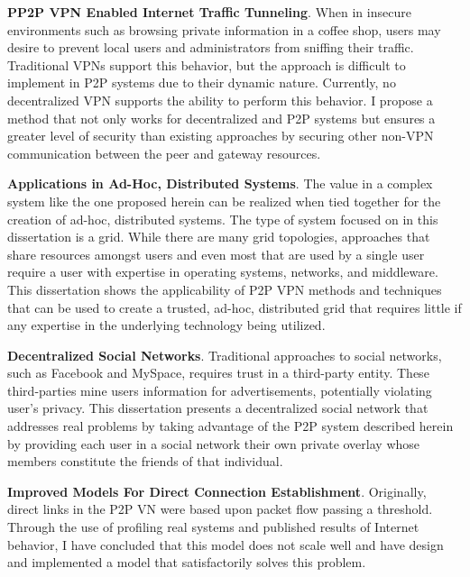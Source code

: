 {\bf PP2P VPN Enabled Internet Traffic Tunneling}. When in insecure
environments such as browsing private information in a coffee shop, users may
desire to prevent local users and administrators from sniffing their traffic.
Traditional VPNs support this behavior, but the approach is difficult to
implement in P2P systems due to their dynamic nature.  Currently, no
decentralized VPN supports the ability to perform this behavior.  I propose a
method that not only works for decentralized and P2P systems but ensures a
greater level of security than existing approaches by securing other non-VPN
communication between the peer and gateway resources.

{\bf Applications in Ad-Hoc, Distributed Systems}. The value in a complex
system like the one proposed herein can be realized when tied together for the
creation of ad-hoc, distributed systems.  The type of system focused on in this
dissertation is a grid.  While there are many grid topologies, approaches that
share resources amongst users and even most that are used by a single user
require a user with expertise in operating systems, networks, and middleware.
This dissertation shows the applicability of P2P VPN methods and techniques
that can be used to create a trusted, ad-hoc, distributed grid that requires
little if any expertise in the underlying technology being utilized.

{\bf Decentralized Social Networks}. Traditional approaches to social networks,
such as Facebook and MySpace, requires trust in a third-party entity.  These
third-parties mine users information for advertisements, potentially violating
user's privacy.  This dissertation presents a decentralized social network that
addresses real problems by taking advantage of the P2P system described herein
by providing each user in a social network their own private overlay whose
members constitute the friends of that individual.

{\bf Improved Models For Direct Connection Establishment}.  Originally, direct
links in the P2P VN were based upon packet flow passing a threshold.  Through
the use of profiling real systems and published results of Internet behavior, I
have concluded that this model does not scale well and have design and
implemented a model that satisfactorily solves this problem.

